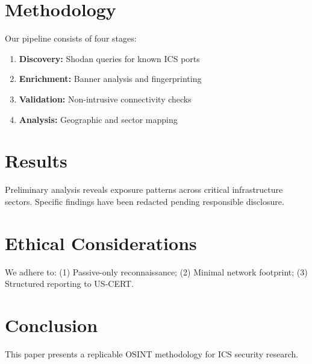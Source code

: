 \documentclass[11pt,a4paper]{article}
\begin{document}
\section{Methodology}

Our pipeline consists of four stages:

\begin{enumerate}
  \item \textbf{Discovery:} Shodan queries for known ICS ports
  \item \textbf{Enrichment:} Banner analysis and fingerprinting
  \item \textbf{Validation:} Non-intrusive connectivity checks
  \item \textbf{Analysis:} Geographic and sector mapping
\end{enumerate}

\section{Results}

Preliminary analysis reveals exposure patterns across critical infrastructure 
sectors. Specific findings have been redacted pending responsible disclosure.

\section{Ethical Considerations}

We adhere to: (1) Passive-only reconnaissance; (2) Minimal network footprint; 
(3) Structured reporting to US-CERT.

\section{Conclusion}

This paper presents a replicable OSINT methodology for ICS security research.


\end{document}
